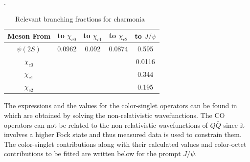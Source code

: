 \documentclass[12pt,a4paper,final]{iopart}
\newcommand{\barQ}{{\bar{Q}}}
\newcommand{\barc}{{\bar{c}}}
\newcommand{\charm}{{\rm{charm}}}
\begin{document}
\begin{table}[h]
\caption{Relevant branching fractions for charmonia~\cite{Nakamura:2010zzi}}.
\begin{tabular}{c|cccc}
Meson From &to $\chi_{c0}$ &to $\chi_{c1}$ &to $\chi_{c2}$ &to $J/\psi$\\ 
\hline
$\psi(2S)$& 0.0962 & 0.092 & 0.0874 & 0.595   \\
$\chi_{c0}$& &  &  & 0.0116           \\
$\chi_{c1}$& &  &  & 0.344           \\
$\chi_{c2}$& &  &  & 0.195           \\
\hline
\end{tabular}
\label{table:CharmoniaBFs}
\end{table}

  The expressions and the values for the color-singlet operators can be found 
in~\cite{Cho:1995ce,Cho:1995vh,Eichten:1994gt} which are obtained by solving the 
non-relativistic wavefunctions.
 The CO operators can not be related to the non-relativistic
wavefunctions of $Q\barQ$ since it involves a higher Fock state and thus
measured data is used to constrain them.
  The color-singlet contributions along with their calculated values 
and color-octet contributions to be fitted are written below for the prompt
$J/\psi$.
\end{document}
